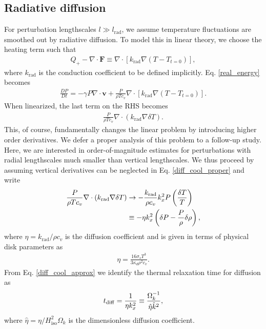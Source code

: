 \subsection{Radiative diffusion}
For perturbation lengthscales $l\gg l_\mathrm{rad}$, we assume 
temperature fluctuations are smoothed out by radiative diffusion. To
model this in linear theory, we choose the heating term such that
\begin{align}
  Q_+ - \nabla\cdot\bm{F} \equiv \nabla\cdot\left[k_\mathrm{rad}\nabla
    \left(T-T_{t=0}\right)\right], 
\end{align} 
where $k_\mathrm{rad}$ is the conduction coefficient to be defined
implicitly. Eq. \ref{real_energy} becomes
\begin{align}
  \frac{DP}{Dt} = -\gamma P \nabla\cdot\bm{v} + \frac{P}{\rho T
    c_v}\nabla\cdot\left[k_\mathrm{rad}\nabla\left(T-T_{t=0}\right)\right].     
\end{align}
When linearized, the last term on the RHS becomes
\begin{align}\label{diff_cool_proper}
  \frac{P}{\rho T c_v} \nabla\cdot\left(k_\mathrm{rad}\nabla\delta
    T\right). 
\end{align}
This, of course, fundamentally changes the linear problem by
introducing higher order derivatives. We defer a proper analysis of
this problem to a follow-up study. Here, we are interested in
order-of-magnitude estimates for perturbations with radial
lengthscales much smaller than vertical lengthscales. We thus proceed
by assuming vertical derivatives can be neglected in
Eq. \ref{diff_cool_proper} and write  
\begin{align}\label{diff_cool_approx}
  \frac{P}{\rho T c_v} \nabla\cdot\left(k_\mathrm{rad}\nabla\delta
    T\right) &\to -\frac{k_\mathrm{rad}}{\rho
    c_v}k_x^2P\left(\frac{\delta T}{T}\right)\notag\\
  &\equiv -\eta k_x^2 \left(\delta P - \frac{P}{\rho}\delta\rho\right), 
\end{align}
where $\eta=k_\mathrm{rad}/\rho c_v$ is the diffusion coefficient and
is given in terms of physical disk parameters as 
\begin{align}\label{eta_def}
  \eta = \frac{16\sigma_s T^3}{3\kappa_d\rho^2 c_v}. 
\end{align}
From Eq. \ref{diff_cool_approx} we identify the thermal relaxation
time for diffusion as 
\begin{align}\label{tc_diff_cool} 
  t_\mathrm{diff} = \frac{1}{\eta k_x^2}\equiv \frac{\Omega_k^{-1}}{\hat{\eta}\hat{k}^2}, 
\end{align}
where $\hat{\eta} = \eta/H_\mathrm{iso}^2\Omega_k$ is the 
dimensionless diffusion coefficient.


